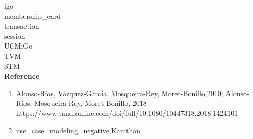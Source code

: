 \documentclass[12pt]{report}
\begin{document}
\gls{igo}\\
\gls{membership_card}\\
\gls{transaction}\\
\gls{session}	\\
\gls{UCMiGo}	\\
\gls{TVM}	\\
\gls{STM}	\\

\printglossaries
\clearpage
\LARGE \textbf {Reference}\normalsize
\begin{enumerate}
\item Alonso-Ríos, Vázquez-García, Mosqueira-Rey, Moret-Bonillo,2010; Alonso-Ríos, Mosqueira-Rey, Moret-Bonillo, 2018\\
https://www.tandfonline.com/doi/full/10.1080/10447318.2018.1424101
\item use\_case\_modeling\_negative,Kamthan
\end{enumerate}
\end{document}
